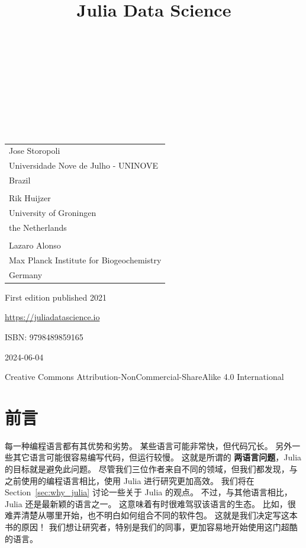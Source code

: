\documentclass[
  notoc %
]{tufte-book}
\title{Julia Data Science}
\author{\noindent{Jose Storopoli}\\[3mm] \noindent{Rik
Huijzer}\\[3mm] \noindent{Lazaro Alonso}\\[3mm] \noindent{刘贵欣
(中文翻译)}\\[3mm] \noindent{田俊 （中文审校）}\\[3mm] }
\date{}
\begin{document}
\makeatletter
\thispagestyle{empty}
\vfill
{\Huge\bf
\noindent
\@title
}\\[1in]
{\Large
\noindent
\@author
}
\makeatother

\makeatletter
\newpage
\thispagestyle{empty}
\vfill
{\noindent
\begin{tabular}{l} Jose Storopoli\\ Universidade Nove de Julho - UNINOVE\\ Brazil\\ \\ Rik Huijzer\\ University of Groningen\\ the Netherlands\\ \\ Lazaro Alonso\\ Max Planck Institute for Biogeochemistry\\ Germany \end{tabular}
}
\vfill
{\small
First edition published 2021

\url{https://juliadatascience.io}

ISBN: 9798489859165

2024-06-04

Creative Commons Attribution-NonCommercial-ShareAlike 4.0 International
}
\makeatother


\frontmatter
\mainmatter

\setcounter{tocdepth}{1}
\tableofcontents

\justifying

\setlength{\parindent}{0pt}

\hypertarget{sec:preface}{%
\chapter{前言}\label{sec:preface}}

每一种编程语言都有其优势和劣势。 某些语言可能非常快，但代码冗长。
另外一些其它语言可能很容易编写代码，但运行较慢。 这就是所谓的
\textbf{两语言问题}，Julia 的目标就是避免此问题。
尽管我们三位作者来自不同的领域，但我们都发现，与之前使用的编程语言相比，使用
Julia 进行研究更加高效。 我们将在 Section~\ref{sec:why_julia}
讨论一些关于 Julia 的观点。 不过，与其他语言相比，Julia
还是最新颖的语言之一。 这意味着有时很难驾驭该语言的生态。
比如，很难弄清楚从哪里开始，也不明白如何组合不同的软件包。
这就是我们决定写这本书的原因！
我们想让研究者，特别是我们的同事，更加容易地开始使用这门超酷的语言。
\end{document}
